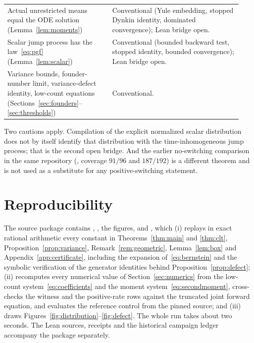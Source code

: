 \documentclass[11pt,a4paper]{article}
\theoremstyle{plain}
\theoremstyle{definition}
\theoremstyle{remark}
\begin{document}
\begin{longtable}{>{\raggedright\arraybackslash}p{0.42\linewidth}>{\raggedright\arraybackslash}p{0.52\linewidth}}
Actual unrestricted means equal the ODE solution (Lemma~\ref{lem:moments}) & Conventional (Yule embedding, stopped Dynkin identity, dominated convergence); Lean bridge open.\\
Scalar jump process has the law~\eqref{eq:pgf} (Lemma~\ref{lem:scalar}) & Conventional (bounded backward test, stopped identity, bounded convergence); Lean bridge open.\\
Variance bounds, founder-number limit, variance-defect identity, low-count equations (Sections~\ref{sec:founders}--\ref{sec:thresholds}) & Conventional.\\
\bottomrule
\end{longtable}

Two cautions apply. Compilation of the explicit normalized scalar distribution does not by itself identify that distribution with the time-inhomogeneous jump process; that is the second open bridge. And the earlier no-switching comparison in the same repository (, coverage $91/96$ and $187/192$) is a different theorem and is not used as a substitute for any positive-switching statement.

\section{Reproducibility}\label{app:repro}
The source package contains , , the figures, and , which (i) replays in exact rational arithmetic every constant in Theorems~\ref{thm:main} and \ref{thm:clt}, Proposition~\ref{prop:variance}, Remark~\ref{rem:geometric}, Lemma~\ref{lem:box} and Appendix~\ref{app:certificate}, including the expansion of~\eqref{eq:bernstein} and the symbolic verification of the generator identities behind Proposition~\ref{prop:defect}; (ii) recomputes every numerical value of Section~\ref{sec:numerics} from the low-count system~\eqref{eq:coefficients} and the moment system~\eqref{eq:secondmoment}, cross-checks the witness and the positive-rate rows against the truncated joint forward equation, and evaluates the reference control from the pinned source; and (iii) draws Figures~\ref{fig:distribution}--\ref{fig:defect}. The whole run takes about two seconds. The Lean sources, receipts and the historical campaign ledger accompany the package separately.



\end{document}
